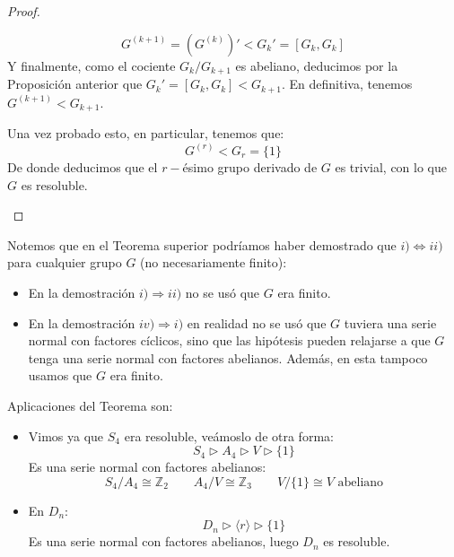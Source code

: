 \begin{teo}
\begin{proof}
\begin{description}
\begin{itemize}
                        \begin{equation*}
                            G^{(k+1)} = (G^{(k)})' < G_k' = [G_k, G_k]
                        \end{equation*}
                        Y finalmente, como el cociente $G_k/G_{k+1}$ es abeliano, deducimos por la Proposición anterior que $G_k' = [G_k, G_k] < G_{k+1}$. En definitiva, tenemos $G^{(k+1)} < G_{k+1}$.
                \end{itemize}
                Una vez probado esto, en particular, tenemos que:
                \begin{equation*}
                    G^{(r)} < G_r = \{1\}
                \end{equation*}
                De donde deducimos que el $r-$ésimo grupo derivado de $G$ es trivial, con lo que $G$ es resoluble.
        \end{description}
    \end{proof}
\end{teo}

\begin{observacion}
    Notemos que en el Teorema superior podríamos haber demostrado que $i)\Longleftrightarrow  ii)$ para cualquier grupo $G$ (no necesariamente finito):
    \begin{itemize}
        \item En la demostración $i)\Longrightarrow ii)$ no se usó que $G$ era finito.
        \item En la demostración $iv)\Longrightarrow i)$ en realidad no se usó que $G$ tuviera una serie normal con factores cíclicos, sino que las hipótesis pueden relajarse a que $G$ tenga una serie normal con factores abelianos. Además, en esta tampoco usamos que $G$ era finito.
    \end{itemize}
\end{observacion}

\begin{ejemplo}
    Aplicaciones del Teorema son:
    \begin{itemize}
        \item Vimos ya que $S_4$ era resoluble, veámoslo de otra forma:
            \begin{equation*}
                S_4 \rhd A_4 \rhd V \rhd \{1\}
            \end{equation*}
            Es una serie normal con factores abelianos:
            \begin{equation*}
                S_4/A_4\cong \mathbb{Z}_2 \qquad A_4/V\cong \mathbb{Z}_3 \qquad V/\{1\}\cong V \text{\ abeliano}
            \end{equation*}
        \item En $D_n$:
            \begin{equation*}
                D_n \rhd \langle r \rangle  \rhd \{1\}
            \end{equation*}
            Es una serie normal con factores abelianos, luego $D_n$ es resoluble.
    \end{itemize}
\end{ejemplo}

